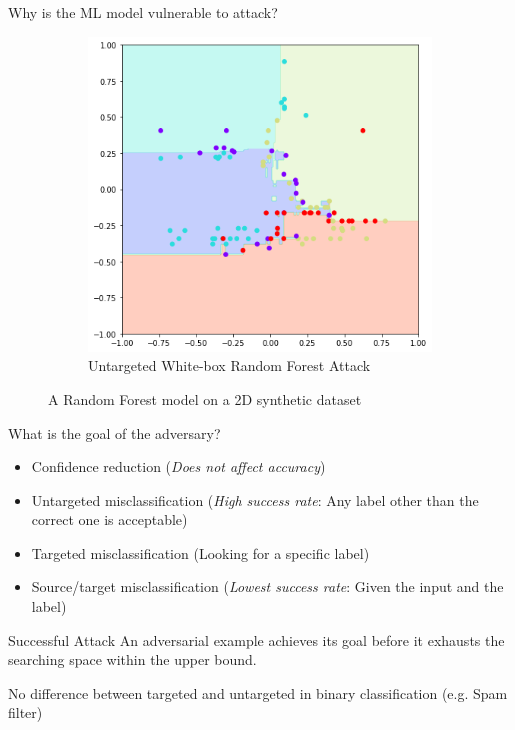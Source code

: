 \documentclass[9pt]{beamer}
\begin{document}
\begin{frame}{Why is the ML model vulnerable to attack?}
\begin{figure}
\begin{subfigure}[t]{0.38\linewidth}
        \includegraphics[width=\linewidth]{images/dt_adv_examples.png}
        \caption{Untargeted White-box Random Forest Attack}
    \end{subfigure}
    \caption{A Random Forest model on a 2D synthetic dataset}
\end{figure}

\hyperlink{reliability}{}
\hyperlink{ad}{}
\end{frame}

\begin{frame}{What is the goal of the adversary?}
\begin{itemize}
    \item Confidence reduction (\textit{Does not affect accuracy})
    \item Untargeted misclassification (\textit{High success rate}: Any label other than the correct one is acceptable)
    \item Targeted misclassification (Looking for a specific label)
    \item Source/target misclassification (\textit{Lowest success rate}: Given the input and the label)
\end{itemize}

\begin{block}{Successful Attack}
An adversarial example achieves its goal before it exhausts the searching space within the upper bound.
\end{block}

No difference between targeted and untargeted in binary classification (e.g. Spam filter)
\end{frame}
\end{document}
